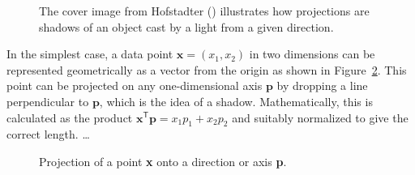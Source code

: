 \documentclass[
  letterpaper,
  10pt,
  krantz2]{krantz}
\begin{document}
{\begin{figure}

\caption{\label{fig-cover-GBE}The cover image from Hofstadter
() illustrates how projections are
shadows of an object cast by a light from a given direction.}

\end{figure}%

In the simplest case, a data point \(\mathbf{x} = (x_1, x_2)\) in two
dimensions can be represented geometrically as a vector from the origin
as shown in Figure~\ref{fig-projection}. This point can be projected on
any one-dimensional axis \(\mathbf{p}\) by dropping a line perpendicular
to \(\mathbf{p}\), which is the idea of a shadow. Mathematically, this
is calculated as the product
\(\mathbf{x}^\textsf{T} \mathbf{p} = x_1 p_1 + x_2 p_2\) and suitably
normalized to give the correct length. \ldots{}

\begin{figure}


\caption{\label{fig-projection}Projection of a point \textbf{x} onto a
direction or axis \textbf{p}.}

\end{figure}%

}
\end{document}
